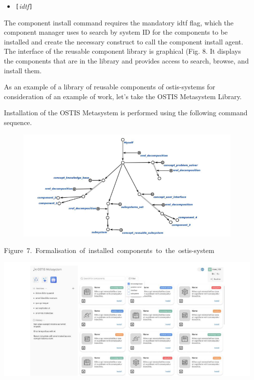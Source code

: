 \documentclass[twocolumn]{article}
\begin{document}
\begin{itemize}
  \setlength{\itemindent}{1em}
       \item\qquad\texttt{[}\textit{idtf}\texttt{]}   
\end{itemize}
\begin{flushleft}
\quad The component install command requires the mandatory idtf flag, which the component manager uses to
search by system ID for the components to be installed
and create the necessary construct to call the component
install agent.\hfill\break
\quad The interface of the reusable component library is
graphical (Fig. 8. It displays the components that are
in the library and provides access to search, browse, and
install them.
\end{flushleft}
\mbox{}
\begin{flushleft}
\quad As an example of a library of reusable components of
ostis-systems for consideration of an example of work,
let’s take the OSTIS Metasystem Library.

\quad Installation of the OSTIS Metasystem is performed
using the following command sequence.
\end{flushleft}
\begin{figure}[h]
\centering

\includegraphics[width=\textwidth]{1foto.png}
    \label{fig:example}
\end{figure}
\noindent
\newpage
 \hspace{2cm}\mbox{Figure 7. Formalisation of installed components to the ostis-system}
   
\vspace{100pt}

\includegraphics[width=2.3\linewidth]{foto2.png}
    \label{fig:example}
   
\end{document}
